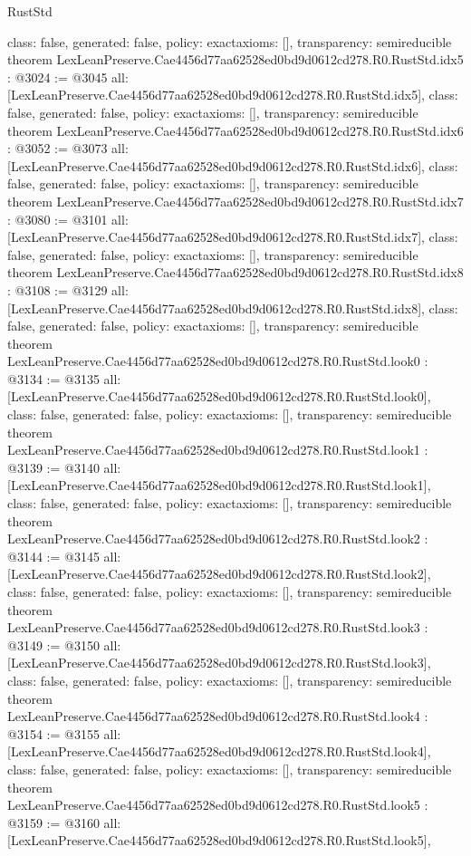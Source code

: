 \begin{lexlean}{RustStd}
\begin{coremodule}
{  class: false,
  generated: false,
  policy: exact{axioms: []},
  transparency: semireducible
}
theorem LexLeanPreserve.Cae4456d77aa62528ed0bd9d0612cd278.R0.RustStd.idx5 : @3024 := @3045 {
  all: [LexLeanPreserve.Cae4456d77aa62528ed0bd9d0612cd278.R0.RustStd.idx5],
  class: false,
  generated: false,
  policy: exact{axioms: []},
  transparency: semireducible
}
theorem LexLeanPreserve.Cae4456d77aa62528ed0bd9d0612cd278.R0.RustStd.idx6 : @3052 := @3073 {
  all: [LexLeanPreserve.Cae4456d77aa62528ed0bd9d0612cd278.R0.RustStd.idx6],
  class: false,
  generated: false,
  policy: exact{axioms: []},
  transparency: semireducible
}
theorem LexLeanPreserve.Cae4456d77aa62528ed0bd9d0612cd278.R0.RustStd.idx7 : @3080 := @3101 {
  all: [LexLeanPreserve.Cae4456d77aa62528ed0bd9d0612cd278.R0.RustStd.idx7],
  class: false,
  generated: false,
  policy: exact{axioms: []},
  transparency: semireducible
}
theorem LexLeanPreserve.Cae4456d77aa62528ed0bd9d0612cd278.R0.RustStd.idx8 : @3108 := @3129 {
  all: [LexLeanPreserve.Cae4456d77aa62528ed0bd9d0612cd278.R0.RustStd.idx8],
  class: false,
  generated: false,
  policy: exact{axioms: []},
  transparency: semireducible
}
theorem LexLeanPreserve.Cae4456d77aa62528ed0bd9d0612cd278.R0.RustStd.look0 : @3134 := @3135 {
  all: [LexLeanPreserve.Cae4456d77aa62528ed0bd9d0612cd278.R0.RustStd.look0],
  class: false,
  generated: false,
  policy: exact{axioms: []},
  transparency: semireducible
}
theorem LexLeanPreserve.Cae4456d77aa62528ed0bd9d0612cd278.R0.RustStd.look1 : @3139 := @3140 {
  all: [LexLeanPreserve.Cae4456d77aa62528ed0bd9d0612cd278.R0.RustStd.look1],
  class: false,
  generated: false,
  policy: exact{axioms: []},
  transparency: semireducible
}
theorem LexLeanPreserve.Cae4456d77aa62528ed0bd9d0612cd278.R0.RustStd.look2 : @3144 := @3145 {
  all: [LexLeanPreserve.Cae4456d77aa62528ed0bd9d0612cd278.R0.RustStd.look2],
  class: false,
  generated: false,
  policy: exact{axioms: []},
  transparency: semireducible
}
theorem LexLeanPreserve.Cae4456d77aa62528ed0bd9d0612cd278.R0.RustStd.look3 : @3149 := @3150 {
  all: [LexLeanPreserve.Cae4456d77aa62528ed0bd9d0612cd278.R0.RustStd.look3],
  class: false,
  generated: false,
  policy: exact{axioms: []},
  transparency: semireducible
}
theorem LexLeanPreserve.Cae4456d77aa62528ed0bd9d0612cd278.R0.RustStd.look4 : @3154 := @3155 {
  all: [LexLeanPreserve.Cae4456d77aa62528ed0bd9d0612cd278.R0.RustStd.look4],
  class: false,
  generated: false,
  policy: exact{axioms: []},
  transparency: semireducible
}
theorem LexLeanPreserve.Cae4456d77aa62528ed0bd9d0612cd278.R0.RustStd.look5 : @3159 := @3160 {
  all: [LexLeanPreserve.Cae4456d77aa62528ed0bd9d0612cd278.R0.RustStd.look5],
}
\end{coremodule}
\end{lexlean}
